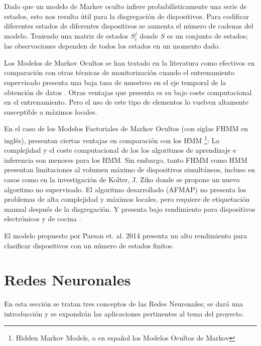 Dado que un modelo de Markov oculto infiere probabilísticamente una serie de estados, esto nos resulta útil para la disgregación de dispositivos. Para codificar diferentes estados de diferentes dispositivos se aumenta el número de cadenas del modelo. Teniendo una matriz de estados $S_i^j$ donde $S$ es un conjunto de estados; las observaciones dependen de todos los estados en un momento dado.

Los Modelos de Markov Ocultos se han tratado en la literatura como efectivos en comparación con otras técnicas de monitorización cuando el entrenamiento supervisado presenta una baja tasa de muestreo en el eje temporal de la obtención de datos \autocite{frenchHMMNILM}.
Otras ventajas que presenta es su bajo coste computacional en el entrenamiento. Pero el uso de este tipo de elementos lo vuelven altamente susceptible a máximos locales\autocite{NILMreview2017}.

En el caso de los Modelos Factoriales de Markov Ocultos (con siglas FHMM en inglés), presentan ciertas ventajas en comparación con los HMM \footnote{Hidden Markov Models, o en español los Modelos Ocultos de Markov}:
La complejidad y el coste computacional de los los algoritmos de aprendizaje e inferencia son menores para los HMM. Sin embargo, tanto FHMM como HMM presentan limitaciones al volumen máximo de dispositivos simultáneos, incluso en casos como en la investigación de Kolter, J. Ziko \autocite{afmap2012} donde se propone un nuevo algoritmo no supervisado. El algoritmo desarrollado (AFMAP) no presenta los problemas de alta complejidad y máximos locales, pero requiere de etiquetación manual después de la disgregación. Y presenta bajo rendimiento para dispositivos electrónicos y de cocina \autocite[5]{NILMreview2017}.

El modelo propuesto por Parson et. al. 2014 \autocite{Parson2014} presenta un alto rendimiento para clasificar dispositivos con un número de estados finitos.


\section{Redes Neuronales}
\label{RN}

En esta sección se tratan tres conceptos de las Redes Neuronales; se dará una introducción y se expondrán las aplicaciones pertinentes al tema del proyecto.
